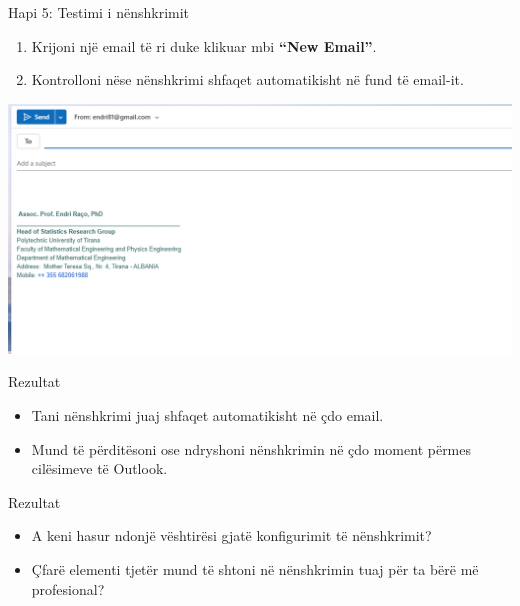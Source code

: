 \documentclass[
  ignorenonframetext,
]{beamer}
\begin{document}
\begin{frame}{Hapi 5: Testimi i nënshkrimit}
\label{hapi-5-testimi-i-nuxebnshkrimit}
\begin{enumerate}
\item
  Krijoni një email të ri duke klikuar mbi \textbf{``New Email''}.
\item
  Kontrolloni nëse nënshkrimi shfaqet automatikisht në fund të email-it.
\end{enumerate}

\includegraphics{./images/outlook10.png}
\end{frame}

\begin{frame}{Rezultat}
\label{rezultat}
\begin{itemize}
\item
  Tani nënshkrimi juaj shfaqet automatikisht në çdo email.
\item
  Mund të përditësoni ose ndryshoni nënshkrimin në çdo moment përmes
  cilësimeve të Outlook.
\end{itemize}
\end{frame}

\begin{frame}{Rezultat}
\label{rezultat-1}
\begin{itemize}
\item
  A keni hasur ndonjë vështirësi gjatë konfigurimit të nënshkrimit?
\item
  Çfarë elementi tjetër mund të shtoni në nënshkrimin tuaj për ta bërë
  më profesional?
\end{itemize}
\end{frame}
\end{document}
